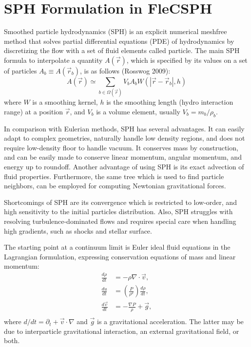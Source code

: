\documentclass[notes.tex]{subfiles}
\begin{document}
\section{SPH Formulation in FleCSPH}
Smoothed particle hydrodynamics (SPH) is an explicit numerical meshfree method
that solves partial differential equations (PDE) of hydrodynamics by
discretizing the flow with a set of fluid elements called particle. 
The main SPH formula to interpolate a quantity $A(\vec{r})$, which is
specified by its values on a set of particles $A_b \equiv A(\vec{r}_b)$, 
is as follows (Rosswog 2009):
\begin{equation}
A(\vec{r}) \simeq \sum_{b\in\Omega(\vec{r})} V_b A_b W(|\vec{r}-\vec{r}_b|,h)
\end{equation}
where $W$ is a smoothing kernel, 
$h$ is the smoothing length (hydro interaction range) at a position $\vec{r}$, 
and $V_b$ is a volume element, usually $V_b = m_b/\rho_b$.

In comparison with Eulerian methods, SPH has several advantages. It can easily
adapt to complex geometries, naturally handle low density regions, and does
not require low-density floor to handle vacuum. It conserves mass by
construction, and can be easily made to conserve linear momentum, angular
momentum, and energy up to roundoff. Another advantage of using SPH is its
exact advection of fluid properties. Furthermore, the same tree which is used
to find particle neighbors, can be employed for computing Newtonian
gravitational forces.

Shortcomings of SPH are its convergence which is restricted to low-order, 
and high sensitivity to the initial particles distribution. 
Also, SPH struggles with resolving turbulence-dominated flows and requires
special care when handling high gradients, such as shocks and stellar surface.


The starting point at a continuum limit is Euler ideal fluid equations in the
Lagrangian formulation, expressing conservation equations of mass and linear
momentum:
\begin{align}
\frac{d \rho}{d t} &= - \rho \nabla \cdot \vec{v}, \\
\frac{d u}{d t} &= \left( \frac{P}{\rho^2} \right) \frac{d \rho}{d t}, \\
\frac{d \vec{v}}{d t} &= - \frac{\nabla P}{\rho} + \vec{g}, \\
\end{align}
where $d/dt = \partial_t + \vec{v} \cdot \nabla$ and $\vec{g}$ is
a gravitational acceleration. The latter may be due to interparticle
gravitational interaction, an external gravitational field, or both.
\end{document}
